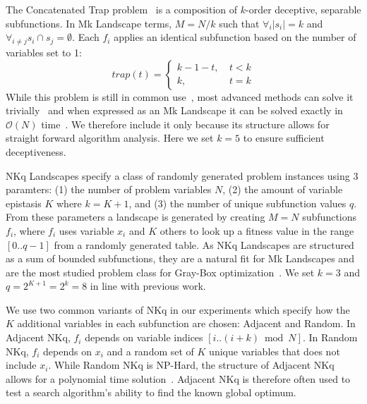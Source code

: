 \documentclass[runningheads,a4paper]{llncs}
\newcommand{\BigO}[1]{$\mathcal{O}{(#1)}$}
\begin{document}
The Concatenated Trap problem~\cite{deb:1992:trap} is a composition of $k$-order deceptive,
separable subfunctions. In Mk Landscape terms, $M=N/k$ such that $\forall_i |s_i| = k$ and
$\forall_{i \neq j} s_i \cap s_j = \emptyset$. Each $f_i$ applies an identical subfunction based
on the number of variables set to 1:
\begin{equation}
   trap(t) = \left\{
     \begin{array}{rl}
       k-1-t,~ &  t<k\\
       k,~   &  t = k
     \end{array}
   \right.
  \label{eq-trap}
\end{equation}
While this problem is still in common use~\cite{hsu:2015:dsmgaII,inoue:2015:adaptivep3},
most advanced methods can solve it trivially~\cite{goldman:2012:ltga} and when expressed
as an Mk Landscape it can be solved exactly in \BigO{N} time~\cite{whitley:2015:mk}.
We therefore include it only because its structure allows for straight forward algorithm analysis.
Here we set $k=5$ to ensure sufficient deceptiveness.

NKq Landscapes specify a class of randomly generated problem instances using 3 paramters:
(1) the number of problem variables $N$, (2) the amount of variable epistasis $K$ where $k=K+1$,
and (3) the number of unique subfunction values $q$. From these parameters a landscape is generated
by creating $M=N$ subfunctions $f_i$, where $f_i$ uses variable $x_i$ and $K$ others to look up
a fitness value in the range $[0..q-1]$ from a randomly generated table.
As NKq Landscapes are structured as a sum of bounded subfunctions, they are a natural fit
for Mk Landscapes
and are the most studied problem class for Gray-Box
optimization~\cite{whitley:2012:constant,chicano:2014:ball,goldman:2015:GBO,tintos:2015:partitioncross,ochoa:2015:crossovernetworks,whitley:2015:mk}.
We set $k=3$ and $q=2^{K+1}=2^{k}=8$ in line with previous work.

We use two common variants of NKq in our experiments which specify how the $K$ additional
variables in each subfunction are chosen: Adjacent and Random. In Adjacent NKq, $f_i$ depends
on variable indices $[i..(i+k) \bmod N]$. In Random NKq, $f_i$ depends on $x_i$ and a random
set of $K$ unique variables that does not include $x_i$. While Random NKq is NP-Hard,
the structure of Adjacent NKq allows for a polynomial time solution~\cite{wright:2000:solvingnk}.
Adjacent NKq is therefore often used to test a search algorithm's ability to
find the known global optimum.
\end{document}
